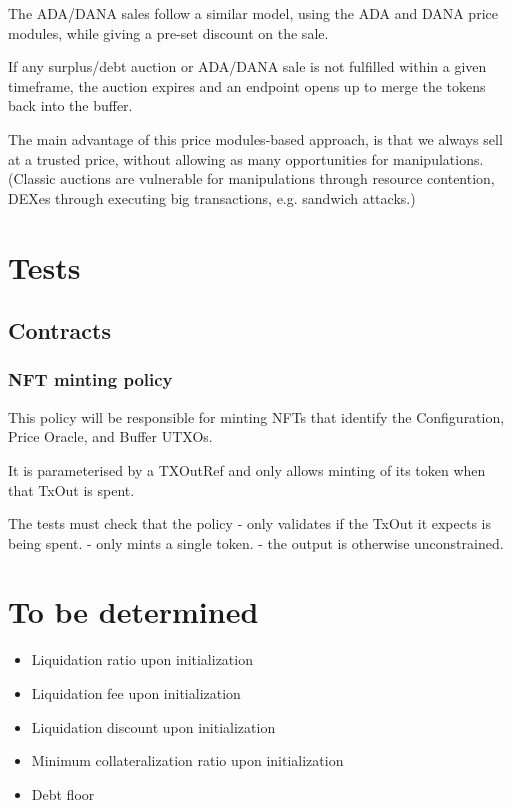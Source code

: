 \documentclass{article} %
\begin{document}
The ADA/DANA sales follow a similar model, using the ADA and DANA price modules,
while giving a pre-set discount on the sale.

If any surplus/debt auction or ADA/DANA sale is not fulfilled within a given
timeframe, the auction expires and an endpoint opens up to merge the tokens back
into the buffer.

The main advantage of this price modules-based approach, is that we always sell
at a trusted price, without allowing as many opportunities for manipulations.
(Classic auctions are vulnerable for manipulations through resource contention,
DEXes through executing big transactions, e.g. sandwich attacks.)

\section{Tests}

\subsection{Contracts}

\subsubsection{NFT minting policy}
This policy will be responsible for minting NFTs that identify the Configuration, Price Oracle, and Buffer UTXOs.

It is parameterised by a TXOutRef and only allows minting of its token when that TxOut is spent.

The tests must check that the policy
  - only validates if the TxOut it expects is being spent.
  - only mints a single token.
  - the output is otherwise unconstrained.


% 

\section{To be determined}

\begin{itemize}
  \item Liquidation ratio upon initialization
  \item Liquidation fee upon initialization
  \item Liquidation discount upon initialization
  \item Minimum collateralization ratio upon initialization
  \item Debt floor
\end{itemize}
\end{document}
